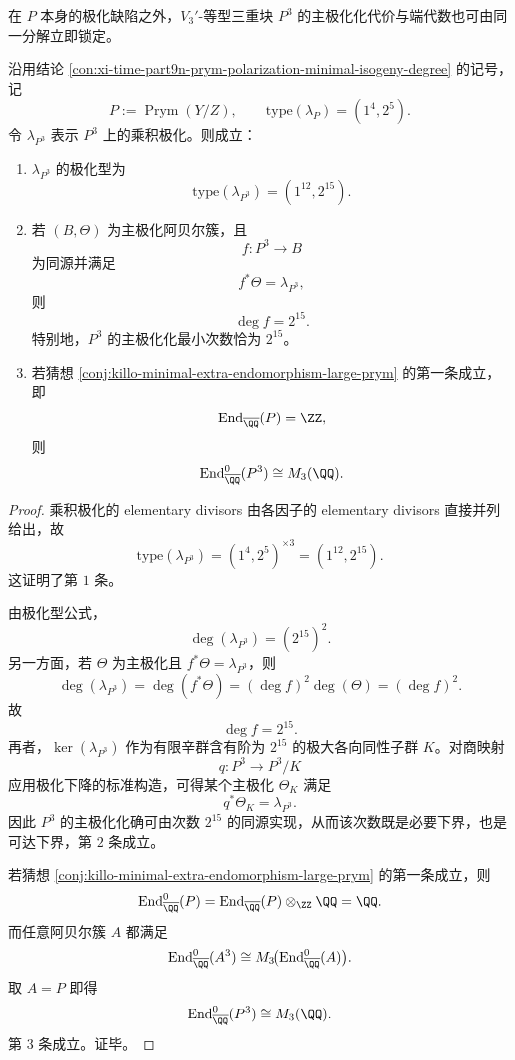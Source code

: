 在 \(P\) 本身的极化缺陷之外，\(V_3'\)-等型三重块 \(P^3\) 的主极化化代价与端代数也可由同一分解立即锁定。

\begin{theorem}\label{thm:xi-time-part9n-prym-cubed-principalization-endomorphism}
沿用结论 \ref{con:xi-time-part9n-prym-polarization-minimal-isogeny-degree} 的记号，记
\[
P:=\operatorname{Prym}(Y/Z),
\qquad
\mathrm{type}(\lambda_P)=(1^4,2^5).
\]
令 \(\lambda_{P^3}\) 表示 \(P^3\) 上的乘积极化。则成立：
\begin{enumerate}
  \item \(\lambda_{P^3}\) 的极化型为
  \[
  \mathrm{type}(\lambda_{P^3})=(1^{12},2^{15}).
  \]
  \item 若 \((B,\Theta)\) 为主极化阿贝尔簇，且
  \[
  f:P^3\to B
  \]
  为同源并满足
  \[
  f^*\Theta=\lambda_{P^3},
  \]
  则
  \[
  \deg f=2^{15}.
  \]
  特别地，\(P^3\) 的主极化化最小次数恰为 \(2^{15}\)。
  \item 若猜想 \ref{conj:killo-minimal-extra-endomorphism-large-prym} 的第一条成立，即
  \[
  \operatorname{End}_{\overline{\QQ}}(P)=\ZZ,
  \]
  则
  \[
  \operatorname{End}^0_{\overline{\QQ}}(P^3)\cong M_3(\QQ).
  \]
\end{enumerate}
\end{theorem}
\begin{proof}
乘积极化的 elementary divisors 由各因子的 elementary divisors 直接并列给出，故
\[
\mathrm{type}(\lambda_{P^3})
=
(1^4,2^5)^{\times 3}
=(1^{12},2^{15}).
\]
这证明了第 \(1\) 条。

由极化型公式，
\[
\deg(\lambda_{P^3})=(2^{15})^2.
\]
另一方面，若 \(\Theta\) 为主极化且 \(f^*\Theta=\lambda_{P^3}\)，则
\[
\deg(\lambda_{P^3})
=
\deg(f^*\Theta)
=
(\deg f)^2\deg(\Theta)
=
(\deg f)^2.
\]
故
\[
\deg f=2^{15}.
\]
再者，\(\ker(\lambda_{P^3})\) 作为有限辛群含有阶为 \(2^{15}\) 的极大各向同性子群 \(K\)。对商映射
\[
q:P^3\to P^3/K
\]
应用极化下降的标准构造，可得某个主极化 \(\Theta_K\) 满足
\[
q^*\Theta_K=\lambda_{P^3}.
\]
因此 \(P^3\) 的主极化化确可由次数 \(2^{15}\) 的同源实现，从而该次数既是必要下界，也是可达下界，第 \(2\) 条成立。

若猜想 \ref{conj:killo-minimal-extra-endomorphism-large-prym} 的第一条成立，则
\[
\operatorname{End}^0_{\overline{\QQ}}(P)
=
\operatorname{End}_{\overline{\QQ}}(P)\otimes_{\ZZ}\QQ
=
\QQ.
\]
而任意阿贝尔簇 \(A\) 都满足
\[
\operatorname{End}^0_{\overline{\QQ}}(A^3)\cong
M_3\!\bigl(\operatorname{End}^0_{\overline{\QQ}}(A)\bigr).
\]
取 \(A=P\) 即得
\[
\operatorname{End}^0_{\overline{\QQ}}(P^3)\cong M_3(\QQ).
\]
第 \(3\) 条成立。证毕。
\end{proof}

\endinput
